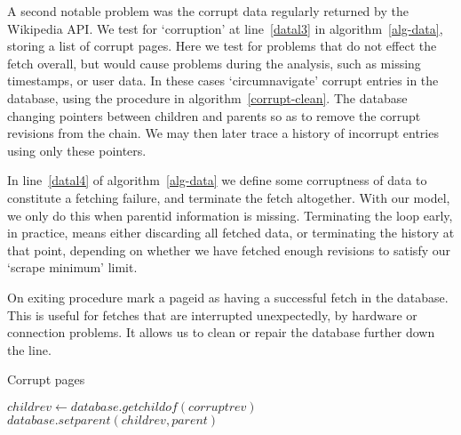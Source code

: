 A second notable problem was the corrupt data regularly returned by
the Wikipedia API. We test for `corruption' at line~\ref{datal3} in
algorithm~\ref{alg-data}, storing a list of corrupt pages. Here we test
for problems that do not effect the fetch overall, but would cause
problems during the analysis, such as missing timestamps, or user
data. In these cases `circumnavigate' corrupt entries in the database,
using the procedure in algorithm~\ref{corrupt-clean}. The database
changing pointers between children and parents so as to remove the
corrupt revisions from the chain. We may then later trace a history of
incorrupt entries using only these pointers.

In line~\ref{datal4} of algorithm~\ref{alg-data} we define some
corruptness of data to constitute a fetching failure, and terminate
the fetch altogether. With our model, we only do this when parentid
information is missing. Terminating the loop early, in practice, means
either discarding all fetched data, or terminating the history at that
point, depending on whether we have fetched enough revisions to
satisfy our `scrape minimum' limit.

On exiting procedure mark a pageid as having a successful fetch in the
database. This is useful for fetches that are interrupted
unexpectedly, by hardware or connection problems. It allows us to
clean or repair the database further down the line.

\begin{algorithm}
  \caption{Corrupt pages}\label{corrupt-clean}
  \begin{algorithmic}[5]
    \State $childrev \gets database.getchildof(corruptrev)$
    \State $database.setparent(childrev, parent)$ 
    \EndProcedure
  \end{algorithmic}
\end{algorithm}

